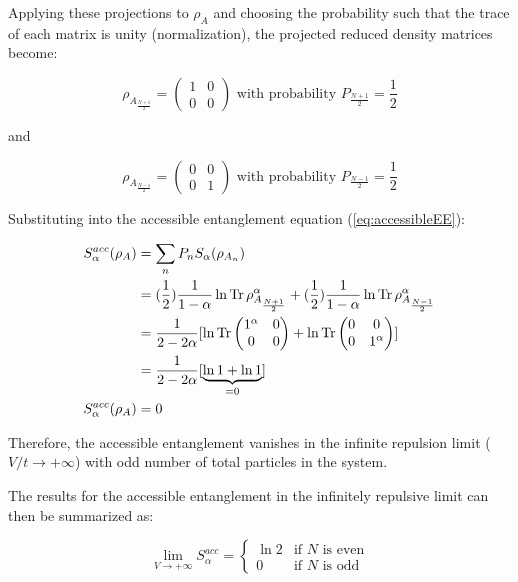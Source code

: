 \begin{samepage}
Applying these projections to $\rho_{A}$ and choosing the probability such that the trace of each matrix is unity (normalization), the projected reduced density matrices become:

\begin{equation}
\rho_{A_{\frac{N+1}{2}}} = \begin{pmatrix} 1 & 0 \\ 0 & 0 \end{pmatrix}  \text{ with probability } P_{\frac{N+1}{2}} = \frac{1}{2}
\end{equation}

and 

\begin{equation}
\rho_{A_{\frac{N-1}{2}}} = \begin{pmatrix} 0 & 0 \\ 0 & 1 \end{pmatrix}  \text{ with probability } P_{\frac{N-1}{2}} = \frac{1}{2}
\end{equation}

Substituting into the accessible entanglement equation (\ref{eq:accessibleEE}):

\begin {align} 
S_{\alpha}^{acc}(\rho_A) &= \sum_{n} P_n S_{\alpha}(\rho_{A_n}) \nonumber \\
&= (\frac{1}{2})\frac{1}{1-\alpha} \ln{\operatorname{Tr}{\rho_{A_{\frac{N+1}{2}}}^{\alpha}}} + (\frac{1}{2})\frac{1}{1-\alpha} \ln{\operatorname{Tr}{\rho_{A_{\frac{N-1}{2}}}^{\alpha}}} \nonumber \\
&=\frac{1}{2-2\alpha}[ \ln{\operatorname{Tr}{\begin{pmatrix}  1^{\alpha} & 0 \\ 0 & 0   \end{pmatrix}}} + \ln{\operatorname{Tr}{\begin{pmatrix}  0 & 0 \\ 0 & 1^{\alpha}   \end{pmatrix}}}] \nonumber \\
&=  \frac{1}{2-2\alpha}[ \underbrace{\ln{1} + \ln{1}}_{=0} ] \nonumber \\
S_{\alpha}^{acc}(\rho_A) &= 0
\end {align}

Therefore, the accessible entanglement vanishes in the infinite repulsion limit ($V/t \to + \infty$) with odd number of total particles in the system.

The results for the accessible entanglement in the infinitely repulsive limit can then be summarized as:

\begin{equation}
\lim_{V \to + \infty} S_{\alpha}^{acc} =
\begin{cases}
\ln{2}  & \text{if }N\text{ is even} \\
0 & \text{if }N\text{ is odd}
\end{cases}
\end{equation}

\end{samepage}

